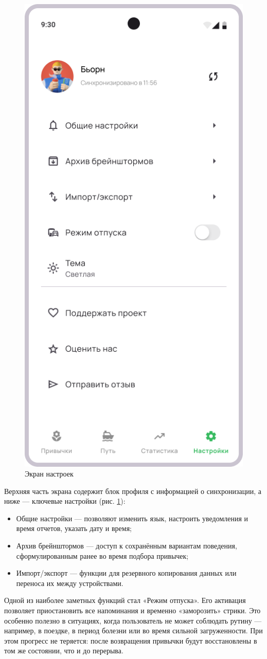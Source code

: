 \documentclass[pdflatex,sn-mathphys-num]{sn-jnl}%
\theoremstyle{thmstyleone}%
\theoremstyle{thmstyletwo}%
\theoremstyle{thmstylethree}%
\begin{document}
\begin{figure}
    \centering
    \includegraphics[width=0.5\linewidth]{figures/App/Settings.png}
    \caption{Экран настроек}
    \label{fig:Settings}
\end{figure}

Верхняя часть экрана содержит блок профиля с информацией о синхронизации, а ниже — ключевые настройки (рис. \ref{fig:Settings}):

\begin{itemize}
    \item Общие настройки — позволяют изменить язык, настроить уведомления и время отчетов, указать дату и время;
    \item Архив брейнштормов — доступ к сохранённым вариантам поведения, сформулированным ранее во время подбора привычек;
    \item Импорт/экспорт — функции для резервного копирования данных или переноса их между устройствами.
\end{itemize}

Одной из наиболее заметных функций стал «Режим отпуска». Его активация позволяет приостановить все напоминания и временно «заморозить» стрики. Это особенно полезно в ситуациях, когда пользователь не может соблюдать рутину — например, в поездке, в период болезни или во время сильной загруженности. При этом прогресс не теряется: после возвращения привычки будут восстановлены в том же состоянии, что и до перерыва.
\end{document}
